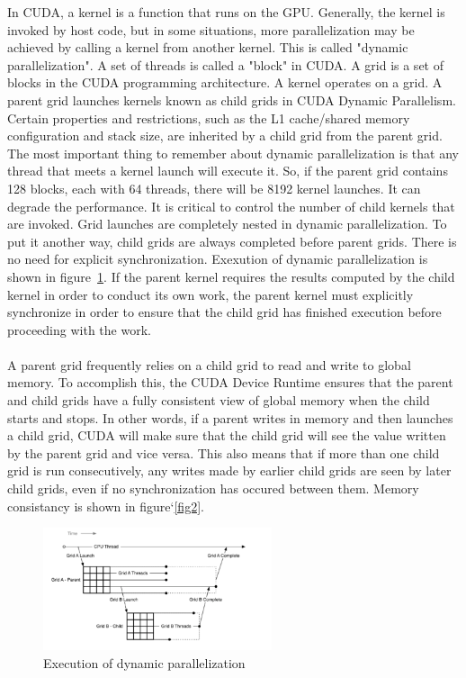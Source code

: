 \documentclass[11pt]{article}       %
\begin{document}
In CUDA, a kernel is a function that runs on the GPU. Generally, the kernel is invoked by host code, but in some situations, more parallelization may be achieved by calling a kernel from another kernel. This is called "dynamic parallelization". A set of threads is called a "block" in CUDA. A grid is a set of blocks in the CUDA programming architecture. A kernel operates on a grid. A parent grid launches kernels known as child grids in CUDA Dynamic Parallelism. Certain properties and restrictions, such as the L1 cache/shared memory configuration and stack size, are inherited by a child grid from the parent grid. The most important thing to remember about dynamic parallelization is that any thread that meets a kernel launch will execute it. So, if the parent grid contains 128 blocks, each with 64 threads, there will be 8192 kernel launches. It can degrade the performance. It is critical to control the number of child kernels that are invoked. Grid launches are completely nested in dynamic parallelization. To put it another way, child grids are always completed before parent grids. There is no need for explicit synchronization. Exexution of dynamic parallelization is shown in figure~\ref{fig1}. If the parent kernel requires the results computed by the child kernel in order to conduct its own work, the parent kernel must explicitly synchronize in order to ensure that the child grid has finished execution before proceeding with the work.
\\
\\
A parent grid frequently relies on a child grid to read and write to global memory. To accomplish this, the CUDA Device Runtime ensures that the parent and child grids have a fully consistent view of global memory when the child starts and stops. In other words, if a parent writes in memory and then launches a child grid, CUDA will make sure that the child grid will see the value written by the parent grid and vice versa. This also means that if more than one child grid is run consecutively, any writes made by earlier child grids are seen by later child grids, even if no synchronization has occured between them. Memory consistancy is shown in figure`\ref{fig2}.

\begin{figure}[h]
\centering
 \includegraphics[width=0.6\textwidth]{Figures/figure1}
 \caption{Execution of dynamic parallelization}
 \label{fig1}
\end{figure}
\end{document}
